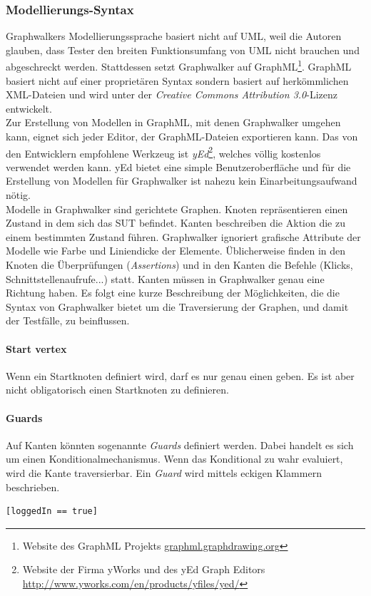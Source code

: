 \subsubsection{Modellierungs-Syntax}
Graphwalkers Modellierungssprache basiert nicht auf UML, weil die Autoren  glauben, dass Tester den breiten Funktionsumfang von UML nicht brauchen und abgeschreckt werden. Stattdessen setzt Graphwalker auf GraphML\footnote{Website des GraphML Projekts \url{graphml.graphdrawing.org}}. GraphML basiert nicht auf einer proprietären Syntax sondern basiert auf herkömmlichen XML-Dateien und wird unter der \textit{Creative Commons Attribution 3.0}-Lizenz entwickelt.\\
Zur Erstellung von Modellen in GraphML, mit denen Graphwalker umgehen kann, eignet sich jeder Editor, der GraphML-Dateien exportieren kann. Das von den Entwicklern empfohlene Werkzeug ist \textit{yEd}\footnote{Website der Firma yWorks und des yEd Graph Editors \url{http://www.yworks.com/en/products/yfiles/yed/}}, welches völlig kostenlos verwendet werden kann. yEd bietet eine simple Benutzeroberfläche und für die Erstellung von Modellen für Graphwalker ist nahezu kein Einarbeitungsaufwand nötig.\\
Modelle in Graphwalker sind gerichtete Graphen. Knoten repräsentieren einen Zustand in dem sich das SUT befindet. Kanten beschreiben die Aktion die zu einem bestimmten Zustand führen. Graphwalker ignoriert grafische Attribute der Modelle wie Farbe und Liniendicke der Elemente. Üblicherweise finden in den Knoten die Überprüfungen (\textit{Assertions}) und in den Kanten die Befehle (Klicks, Schnittstellenaufrufe...) statt. Kanten müssen in Graphwalker genau eine Richtung haben. Es folgt eine kurze Beschreibung der Möglichkeiten, die die Syntax von Graphwalker bietet um die Traversierung der Graphen, und damit der Testfälle, zu beinflussen.

\paragraph{Start vertex} Wenn ein Startknoten definiert wird, darf es nur genau einen geben. Es ist aber nicht obligatorisch einen Startknoten zu definieren.

\paragraph{Guards} Auf Kanten könnten sogenannte \textit{Guards} definiert werden. Dabei handelt es sich um einen Konditionalmechanismus. Wenn das Konditional zu wahr evaluiert, wird die Kante traversierbar. Ein \textit{Guard} wird mittels eckigen Klammern beschrieben. 
\begin{verbatim}
[loggedIn == true]
\end{verbatim}

